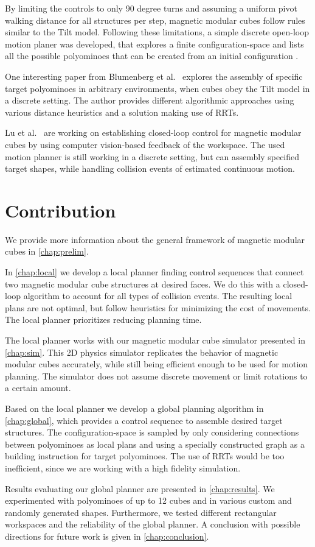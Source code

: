 By limiting the controls to only 90 degree turns and assuming a uniform pivot walking distance for all structures per step, magnetic modular cubes follow rules similar to the Tilt model.
Following these limitations, a simple discrete open-loop motion planer was developed, that explores a finite configuration-space and lists all the possible polyominoes that can be created from an initial configuration \cite{Bhattacharjee2022}.

One interesting paper from Blumenberg et al.\ \cite{blumenberg2023} explores the assembly of specific target polyominoes in arbitrary environments, when cubes obey the Tilt model in a discrete setting.
The author provides different algorithmic approaches using various distance heuristics and a solution making use of RRTs.

Lu et al.\ \cite{Lu2023} are working on establishing closed-loop control for magnetic modular cubes by using computer vision-based feedback of the workspace.
The used motion planner is still working in a discrete setting, but can assembly specified target shapes, while handling collision events of estimated continuous motion.

\newpage

\section{Contribution}

We provide more information about the general framework of magnetic modular cubes in \autoref{chap:prelim}.

In \autoref{chap:local} we develop a local planner finding control sequences that connect two magnetic modular cube structures at desired faces.
We do this with a closed-loop algorithm to account for all types of collision events.
The resulting local plans are not optimal, but follow heuristics for minimizing the cost of movements.
The local planner prioritizes reducing planning time. 

The local planner works with our magnetic modular cube simulator presented in \autoref{chap:sim}.
This 2D physics simulator replicates the behavior of magnetic modular cubes accurately, while still being efficient enough to be used for motion planning.
The simulator does not assume discrete movement or limit rotations to a certain amount.

Based on the local planner we develop a global planning algorithm in \autoref{chap:global}, which provides a control sequence to assemble desired target structures.
The configuration-space is sampled by only considering connections between polyominoes as local plans and using a specially constructed graph as a building instruction for target polyominoes.
The use of RRTs would be too inefficient, since we are working with a high fidelity simulation. 

Results evaluating our global planner are presented in \autoref{chap:results}.
We experimented with polyominoes of up to 12 cubes and in various custom and randomly generated shapes.
Furthermore, we tested different rectangular workspaces and the reliability of the global planner.  
A conclusion with possible directions for future work is given in \autoref{chap:conclusion}.